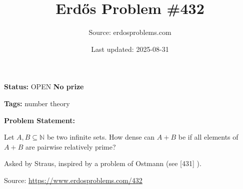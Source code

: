 \documentclass{article}
\title{Erd\H{o}s Problem \#432}
\date{Last updated: 2025-08-31}
\author{Source: erdosproblems.com}
\begin{document}
\maketitle

\noindent\textbf{Status:} OPEN \quad \textbf{No prize}

\noindent\textbf{Tags:} number theory

\medskip

\noindent\textbf{Problem Statement:}

Let $A,B\subseteq \mathbb{N}$ be two infinite sets. How dense can $A+B$ be if all elements of $A+B$ are pairwise relatively prime?




Asked by Straus, inspired by a problem of Ostmann (see [431] ).


\bigskip
\noindent\small{Source: \url{https://www.erdosproblems.com/432}}
\end{document}
